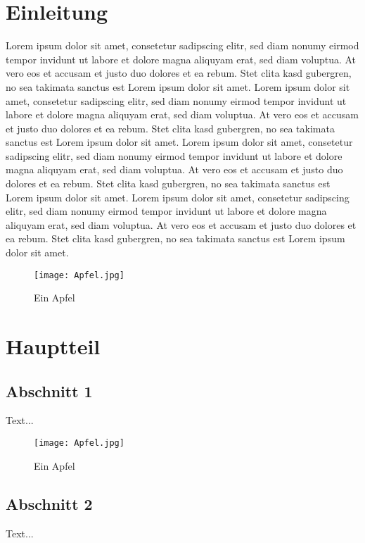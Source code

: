 \documentclass[11pt]{report}
\begin{document}
\chapter{Einleitung}
Lorem ipsum dolor sit amet, consetetur sadipscing elitr, sed diam nonumy eirmod tempor invidunt ut labore et dolore magna aliquyam erat, sed diam voluptua. At vero eos et accusam et justo duo dolores et ea rebum. Stet clita kasd gubergren, no sea takimata sanctus est Lorem ipsum dolor sit amet. Lorem ipsum dolor sit amet, consetetur sadipscing elitr, sed diam nonumy eirmod tempor invidunt ut labore et dolore magna aliquyam erat, sed diam voluptua. At vero eos et accusam et justo duo dolores et ea rebum. Stet clita kasd gubergren, no sea takimata sanctus est Lorem ipsum dolor sit amet. \newline \newline
Lorem ipsum dolor sit amet, consetetur sadipscing elitr, sed diam nonumy eirmod tempor invidunt ut labore et dolore magna aliquyam erat, sed diam voluptua. At vero eos et accusam et justo duo dolores et ea rebum. Stet clita kasd gubergren, no sea takimata sanctus est Lorem ipsum dolor sit amet. Lorem ipsum dolor sit amet, consetetur sadipscing elitr, sed diam nonumy eirmod tempor invidunt ut labore et dolore magna aliquyam erat, sed diam voluptua. At vero eos et accusam et justo duo dolores et ea rebum. Stet clita kasd gubergren, no sea takimata sanctus est Lorem ipsum dolor sit amet.

\begin{figure}[h]
\texttt{[image: Apfel.jpg]}
\centering
\caption{Ein Apfel}
\end{figure}

\chapter{Hauptteil}
\section{Abschnitt 1}
Text...

\begin{figure}[h]
\texttt{[image: Apfel.jpg]}
\centering
\caption{Ein Apfel}
\end{figure}

\section{Abschnitt 2}
Text...
\end{document}
